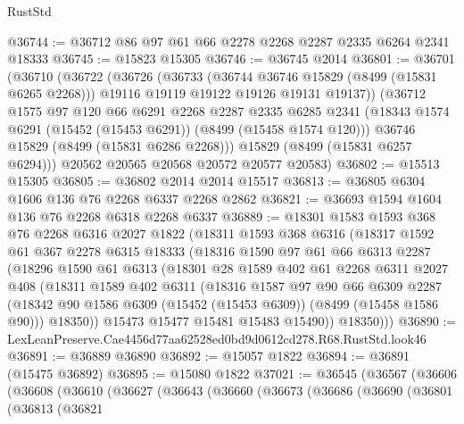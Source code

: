 \begin{lexlean}{RustStd}
\begin{coremodule}
@36744 := @36712 @86 @97 @61 @66 @2278 @2268 @2287 @2335 @6264 @2341 @18333
@36745 := @15823 @15305
@36746 := @36745 @2014
@36801 := @36701
    (@36710
      (@36722
        (@36726
          (@36733
            (@36744 @36746 @15829 (@8499 (@15831 @6265 @2268)))
            @19116
            @19119
            @19122
            @19126
            @19131
            @19137))
        (@36712
          @1575
          @97
          @120
          @66
          @6291
          @2268
          @2287
          @2335
          @6285
          @2341
          (@18343 @1574 @6291 (@15452 (@15453 @6291)) (@8499 (@15458 @1574 @120)))
          @36746
          @15829
          (@8499 (@15831 @6286 @2268)))
        @15829
        (@8499 (@15831 @6257 @6294)))
      @20562
      @20565
      @20568
      @20572
      @20577
      @20583)
@36802 := @15513 @15305
@36805 := @36802 @2014 @2014 @15517
@36813 := @36805 @6304 @1606 @136 @76 @2268 @6337 @2268 @2862
@36821 := @36693 @1594 @1604 @136 @76 @2268 @6318 @2268 @6337
@36889 := @18301
    @1583
    @1593
    @368
    @76
    @2268
    @6316
    @2027
    @1822
    (@18311
      @1593
      @368
      @6316
      (@18317
        @1592
        @61
        @367
        @2278
        @6315
        @18333
        (@18316
          @1590
          @97
          @61
          @66
          @6313
          @2287
          (@18296
            @1590
            @61
            @6313
            (@18301
              @28
              @1589
              @402
              @61
              @2268
              @6311
              @2027
              @408
              (@18311
                @1589
                @402
                @6311
                (@18316
                  @1587
                  @97
                  @90
                  @66
                  @6309
                  @2287
                  (@18342 @90 @1586 @6309 (@15452 (@15453 @6309)) (@8499 (@15458 @1586 @90)))
                  @18350))
              @15473
              @15477
              @15481
              @15483
              @15490))
          @18350)))
@36890 := LexLeanPreserve.Cae4456d77aa62528ed0bd9d0612cd278.R68.RustStd.look46
@36891 := @36889 @36890
@36892 := @15057 @1822
@36894 := @36891 (@15475 @36892)
@36895 := @15080 @1822
@37021 := @36545
    (@36567
      (@36606
        (@36608
          (@36610
            (@36627
              (@36643
                (@36660
                  (@36673
                    (@36686
                      (@36690
                        (@36801
                          (@36813
                            (@36821

\end{coremodule}
\end{lexlean}
